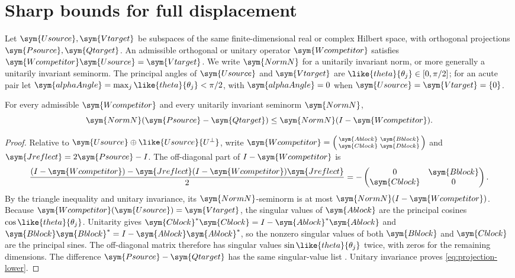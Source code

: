 \section{Sharp bounds for full displacement}
\label{sec:sharp-displacement}

Let $\sym{Usource},\sym{Vtarget}$ be subspaces of the same finite-dimensional real or complex
Hilbert space, with orthogonal projections $\sym{Psource},\sym{Qtarget}$. An admissible orthogonal
or unitary operator $\sym{Wcompetitor}$ satisfies $\sym{Wcompetitor}\sym{Usource}=\sym{Vtarget}$. We write $\sym{NormN}$ for a unitarily
invariant norm, or more generally a unitarily invariant seminorm. The
principal angles of $\sym{Usource}$ and $\sym{Vtarget}$ are $\like{theta}{\theta_j}\in[0,\pi/2]$; for an acute
pair let $\sym{alphaAngle}=\max_j\like{theta}{\theta_j}<\pi/2$, with $\sym{alphaAngle}=0$ when
$\sym{Usource}=\sym{Vtarget}=\{0\}$.

\begin{proposition}
\label{prop:projection-lower}
For every admissible $\sym{Wcompetitor}$ and every unitarily invariant seminorm $\sym{NormN}$,
\begin{equation}
  \sym{NormN}(\sym{Psource}-\sym{Qtarget})\leq \sym{NormN}(I-\sym{Wcompetitor}).
  \label{eq:projection-lower}
\end{equation}
\end{proposition}

\begin{proof}
Relative to $\sym{Usource}\oplus \like{Usource}{U^\perp}$, write
$\sym{Wcompetitor}=\left(\begin{smallmatrix}\sym{Ablock}&\sym{Bblock}\\\sym{Cblock}&\sym{Dblock}\end{smallmatrix}\right)$ and
$\sym{Jreflect}=2\sym{Psource}-I$. The off-diagonal part of $I-\sym{Wcompetitor}$ is
\[
 \frac{(I-\sym{Wcompetitor})-\sym{Jreflect}(I-\sym{Wcompetitor})\sym{Jreflect}}{2}
 =-\begin{pmatrix}0&\sym{Bblock}\\\sym{Cblock}&0\end{pmatrix}.
\]
By the triangle inequality and unitary invariance, its $\sym{NormN}$-seminorm is
at most $\sym{NormN}(I-\sym{Wcompetitor})$. Because $\sym{Wcompetitor}(\sym{Usource})=\sym{Vtarget}$, the singular values of $\sym{Ablock}$ are the
principal cosines $\cos\like{theta}{\theta_j}$. Unitarity gives
$\sym{Cblock}^*\sym{Cblock}=I-\sym{Ablock}^*\sym{Ablock}$ and $\sym{Bblock}\sym{Bblock}^*=I-\sym{Ablock}\sym{Ablock}^*$, so the nonzero singular values of both
$\sym{Bblock}$ and $\sym{Cblock}$ are the principal sines. The off-diagonal matrix therefore
has singular values $\sin\like{theta}{\theta_j}$ twice, with zeros for the remaining
dimensions. The difference $\sym{Psource}-\sym{Qtarget}$ has the same singular-value list
\citep{zhang2007angular,bhatia1997matrix}. Unitary invariance proves
\cref{eq:projection-lower}.
\end{proof}

